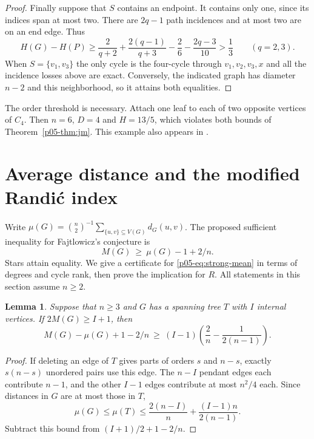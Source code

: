 \documentclass[11pt,a4paper]{article}
\newtheorem{lemma}[theorem]{Lemma}\newtheorem{corollary}[theorem]{Corollary}
\begin{document}
\begin{proof}
Finally suppose that $S$ contains an endpoint. It contains only one,
since its indices span at most two. There are $2q-1$ path incidences
and at most two are on an end edge. Thus
\[
 H(G)-H(P)\ge
 \frac{2}{q+2}+\frac{2(q-1)}{q+3}
 -\frac{2}{6}-\frac{2q-3}{10}>\frac13
 \qquad(q=2,3).
\]
When $S=\{v_1,v_3\}$ the only cycle is the four-cycle through
$v_1,v_2,v_3,x$ and all the incidence losses above are exact.
Conversely, the indicated graph has diameter $n-2$ and this
neighborhood, so it attains both equalities.
\end{proof}

The order threshold is necessary. Attach one leaf to each of two opposite
vertices of $C_4$. Then $n=6$, $D=4$ and $H=13/5$, which violates both
bounds of Theorem~\ref{p05-thm:jm}. This example also appears in \cite{p05-AI}.

\section{Average distance and the modified Randi\'c index}\label{p05-sec:mean}
Write $\mu(G)=\binom n2^{-1}\sum_{\{u,v\}\subseteq V(G)}d_G(u,v)$.
The proposed sufficient inequality for Fajtlowicz's conjecture \cite{p05-Faj} is
\begin{equation}\label{p05-eq:strong-mean}
 M(G)\ \ge\ \mu(G)-1+2/n.
\end{equation}
Stars attain equality. We give a certificate for \eqref{p05-eq:strong-mean} in
terms of degrees and cycle rank, then prove the implication for $R$.
All statements in this section assume $n\ge2$.

\begin{lemma}\label{p05-lem:mean-leaves}
Suppose that $n\ge3$ and $G$ has a spanning tree $T$ with $I$ internal
vertices. If $2M(G)\ge I+1$, then
\[
 M(G)-\mu(G)+1-2/n\ \ge\
 (I-1)\left(\frac{2}{n}-\frac{1}{2(n-1)}\right).
\]
\end{lemma}
\begin{proof}
If deleting an edge of $T$ gives parts of orders $s$ and $n-s$, exactly
$s(n-s)$ unordered pairs use this edge. The $n-I$ pendant edges each
contribute $n-1$, and the other $I-1$ edges contribute at most $n^2/4$
each. Since distances in $G$ are at most those in $T$,
\[
 \mu(G)\le \mu(T)\le\frac{2(n-I)}n+\frac{(I-1)n}{2(n-1)}.
\]
Subtract this bound from $(I+1)/2+1-2/n$.
\end{proof}
\end{document}
